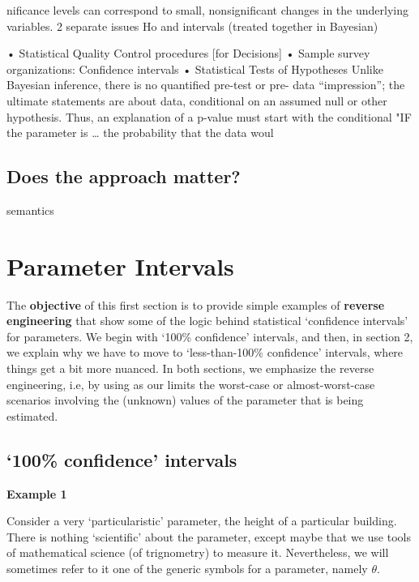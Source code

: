\documentclass[]{book}
\begin{document}
nificance levels can correspond to small, nonsignificant changes in the underlying variables.
2 separate issues Ho and intervals
(treated together in Bayesian)

• Statistical Quality Control procedures {[}for Decisions{]} • Sample survey organizations: Confidence intervals • Statistical Tests of Hypotheses
Unlike Bayesian inference, there is no quantified pre-test or pre- data ``impression''; the ultimate statements are about data, conditional on an assumed null or other hypothesis.
Thus, an explanation of a p-value must start with the conditional "IF the parameter is \ldots{} the probability that the data woul

\hypertarget{does-the-approach-matter}{%
\section{Does the approach matter?}\label{does-the-approach-matter}}

semantics

\hypertarget{CI}{%
\chapter{Parameter Intervals}\label{CI}}

The \textbf{objective} of this first section is to provide simple examples of \textbf{reverse engineering} that show some of the logic behind statistical `confidence intervals' for parameters. We begin with `100\% confidence' intervals, and then, in section 2, we explain why we have to move to `less-than-100\% confidence' intervals, where things get a bit more nuanced.
In both sections, we emphasize the reverse engineering, i.e, by using as our limits the worst-case or almost-worst-case scenarios involving the (unknown) values of the parameter that is being estimated.

\hypertarget{confidence-intervals}{%
\section{`100\% confidence' intervals}\label{confidence-intervals}}

\textbf{Example 1}

Consider a very `particularistic' parameter, the height of a particular building. There is nothing `scientific' about the parameter, except maybe that we use tools of mathematical science (of trignometry) to measure it. Nevertheless, we will sometimes refer to it one of the generic symbols for a parameter, namely \(\theta.\)
\end{document}
